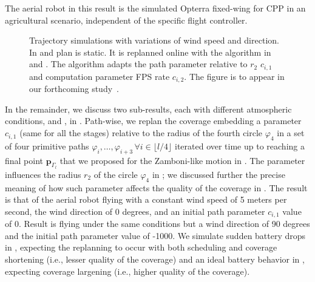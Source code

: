 The aerial robot in this result is the simulated Opterra fixed-wing for CPP in an agricultural scenario, independent of the specific flight controller. 
\begin{figure}[h!]
  \centering
  \selectfont
  \footnotesize    
  
  \caption[Numerical simulations of the trajectory with static and dynamic plans]{Trajectory simulations with variations of wind speed and direction. In  and  plan is static. It is replanned online with the algorithm in  and . The algorithm adapts the path parameter relative to $r_2$ $c_{i,1}$ and computation parameter FPS rate $c_{i,2}$. The figure is to appear in our forthcoming study~\citep{seewald202Xenergy}.}
  \label{fig:trajs-revised}
\end{figure}
In the remainder, we discuss two sub-results, each with different atmospheric conditions,  and , in . Path-wise, we replan the coverage embedding a parameter $c_{i,1}$ (same for all the stages) relative to the radius of the fourth circle $\varphi_4$ in a set of four primitive paths $\varphi_{i},\dots,\varphi_{i+3}\,\forall i\in\lfloor l/4 \rfloor$ iterated over time up to reaching a final point $\mathbf{p}_{\Gamma_l}$ that we proposed for the Zamboni-like motion in . The parameter influences the radius $r_2$ of the circle $\varphi_4$ in ; we discussed further the precise meaning of how such parameter affects the quality of the coverage in . The result  is that of the aerial robot flying with a constant wind speed of 5 meters per second, the wind direction of 0 degrees, and an initial path parameter $c_{i,1}$ value of 0. Result  is flying under the same conditions but a wind direction of 90 degrees and the initial path parameter value of -1000. We simulate sudden battery drops in , expecting the replanning to occur with both scheduling and coverage shortening (i.e., lesser quality of the coverage) and an ideal battery behavior in , expecting coverage largening (i.e., higher quality of the coverage).

